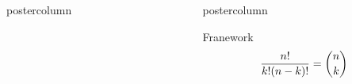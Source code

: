 \documentclass[final]{beamer}
\newlength{\columnheight}
\begin{document}
\begin{frame}
\begin{columns}
\begin{column}{.33\textwidth}
\begin{beamercolorbox}[center,wd=\textwidth]{postercolumn}
\begin{minipage}[T]{.95\textwidth}
{           }
        \end{minipage}
      \end{beamercolorbox}
    \end{column}
    \begin{column}{.33\textwidth}
      \begin{beamercolorbox}[center,wd=\textwidth]{postercolumn}
        \begin{minipage}[T]{.95\textwidth}  %
          \parbox[t][\columnheight]{\textwidth}{ %

            \begin{block}{Franework}
              \lipsum[1-2]
                 \begin{equation}
                   {n! \over k!(n-k)!} = {n \choose k}
                 \end{equation}
                 \lipsum[1]\cite{barata2014color, barata2013towards, barata2013role, barata2013two, barata2014bag}
            \end{block}
            \vfill
  

}
\end{minipage}
\end{beamercolorbox}
\end{column}
\end{columns}
\end{frame}
\end{document}
